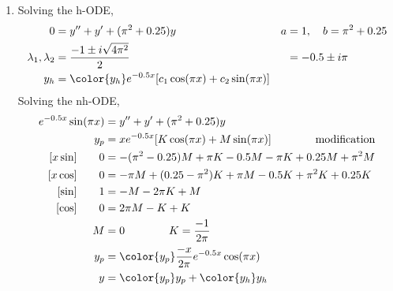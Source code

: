 \begin{enumerate}
    \item Solving the h-ODE,
          \begin{align}
              0                        & = y'' + y' + ( \pi ^{2} + 0.25 )y        &
              a                        & = 1, \quad b = \pi ^{2} + 0.25             \\
              \lambda_{1}, \lambda_{2} & = \frac{-1 \pm i\sqrt{4\pi^{2}}}{2}      &
                                       & = -0.5 \pm i \pi                           \\
              y_{h}                    & = \color{y_h} e^{-0.5x}[c_{1}\cos(\pi x)
                      + c_{2}\sin(\pi x)]
          \end{align}
          Solving the nh-ODE,
          \begin{align}
              e^{-0.5x}\sin (\pi x) & =  y'' + y' + ( \pi ^{2} + 0.25 )y             \\
              y_{p}                 & = xe^{-0.5x}[K \cos (\pi x) + M \sin (\pi x)]
              \qquad\qquad \text{modification}                                       \\
              [x\sin] \qquad 0      & = -(\pi ^{2} - 0.25)M + \pi K - 0.5M - \pi K
              + 0.25M + \pi ^{2}M                                                    \\
              [x\cos] \qquad 0      & =  -\pi M  + (0.25 - \pi ^{2})K + \pi M - 0.5K
              + \pi ^{2}K + 0.25K                                                    \\
              [\sin] \qquad 1       & =-M -2\pi K + M                                \\
              [\cos] \qquad 0       & = 2\pi M - K + K                               \\
              M                     & = 0 \qquad\qquad K = \frac{-1}{2\pi}           \\
              y_{p}                 & = \color{y_p} \frac{-x}{2\pi}e^{-0.5x}
              \cos(\pi x)                                                            \\
              y                     & = {\color{y_p} y_{p}} + {\color{y_h} y_{h}}
          \end{align}


\end{enumerate}
